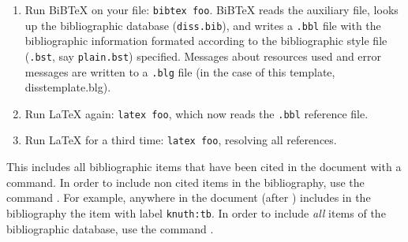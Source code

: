 \begin{enumerate}
\item Run BiB\TeX{} on your file: \texttt{bibtex foo}. 
BiB\TeX{} reads the auxiliary file, looks up the 
bibliographic database (\texttt{diss.bib}), 
and writes a \texttt{.bbl} 
%
file with the bibliographic information formated according to
the bibliographic style file (\texttt{.bst}, 
%
say \texttt{plain.bst}) 
%
specified.  Messages about resources used and error messages
are written to a \texttt{.blg} 
%
file (in the case of this template, disstemplate.blg).

\item Run \LaTeX{} again: \texttt{latex foo}, which now 
reads the \texttt{.bbl} 
%
reference file.

\item Run \LaTeX{} for a third time: \texttt{latex foo}, 
resolving all references.

\end{enumerate}

This includes all bibliographic items that have been cited 
in the document with a  
%
command. In order to include non cited items in the bibliography,
use the command . For example, 
anywhere in the document (after ) includes 
in the bibliography the item with label \texttt{knuth:tb}. 
In order to include \emph{all} items of the bibliographic 
database, use the command .
%
